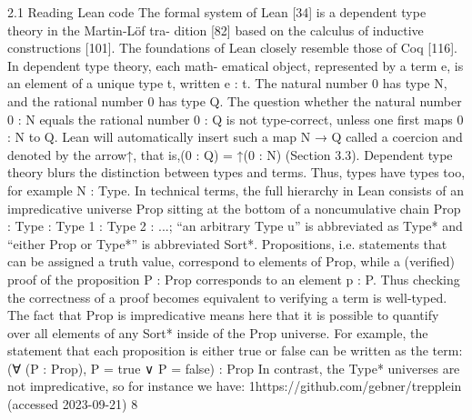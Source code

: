 \documentclass{book}
\theoremstyle{definition}
\begin{document}
2.1 Reading Lean code
The formal system of Lean [34] is a dependent type theory in the Martin-Löf tra- dition [82] based on the calculus of inductive constructions [101]. The foundations of Lean closely resemble those of Coq [116]. In dependent type theory, each math- ematical object, represented by a term e, is an element of a unique type t, written e : t. The natural number 0 has type N, and the rational number 0 has type Q. The question whether the natural number 0 : N equals the rational number 0 : Q is not type-correct, unless one first maps 0 : N to Q. Lean will automatically insert such a map N → Q called a coercion and denoted by the arrow↑, that is,(0 : Q) = ↑(0 : N) (Section 3.3).
Dependent type theory blurs the distinction between types and terms. Thus, types have types too, for example N : Type. In technical terms, the full hierarchy in Lean consists of an impredicative universe Prop sitting at the bottom of a noncumulative chain Prop : Type : Type 1 : Type 2 : ...; “an arbitrary Type u” is abbreviated as Type* and “either Prop or Type*” is abbreviated Sort*. Propositions, i.e. statements that can be assigned a truth value, correspond to elements of Prop, while a (verified) proof of the proposition P : Prop corresponds to an element p : P. Thus checking the correctness of a proof becomes equivalent to verifying a term is well-typed.
The fact that Prop is impredicative means here that it is possible to quantify over all elements of any Sort* inside of the Prop universe. For example, the statement that each proposition is either true or false can be written as the term:
(∀ (P : Prop), P = true ∨ P = false) : Prop
In contrast, the Type* universes are not impredicative, so for instance we have:
1https://github.com/gebner/trepplein (accessed 2023-09-21) 8
 
\end{document}
